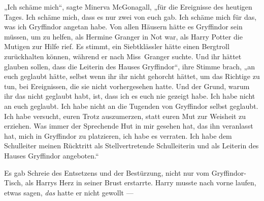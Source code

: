 „Ich schäme mich“, sagte Minerva McGonagall, „für die Ereignisse des heutigen Tages. Ich schäme mich, dass es nur zwei von euch gab. Ich schäme mich für das, was ich Gryffindor angetan habe. Von allen Häusern hätte es Gryffindor sein müssen, um zu helfen, als Hermine Granger in Not war, als Harry Potter die Mutigen zur Hilfe rief. Es stimmt, ein Siebtklässler hätte einen Bergtroll zurückhalten können, während er nach Miss~Granger suchte. Und ihr hättet glauben sollen, dass die Leiterin des Hauses Gryffindor“, ihre Stimme brach, „an euch geglaubt hätte, selbst wenn ihr ihr nicht gehorcht hättet, um das Richtige zu tun, bei Ereignissen, die sie nicht vorhergesehen hatte. Und der Grund, warum ihr das nicht geglaubt habt, ist, dass ich es euch nie gezeigt habe. Ich habe nicht an euch geglaubt. Ich habe nicht an die Tugenden von Gryffindor selbst geglaubt. Ich habe versucht, euren Trotz auszumerzen, statt euren Mut zur Weisheit zu erziehen. Was immer der Sprechende Hut in mir gesehen hat, das ihn veranlasst hat, mich in Gryffindor zu platzieren, ich habe es verraten. Ich habe dem Schulleiter meinen Rücktritt als Stellvertretende Schulleiterin und als Leiterin des Hauses Gryffindor angeboten.“

\later

Es gab Schreie des Entsetzens und der Bestürzung, nicht nur vom Gryffindor-Tisch, als Harrys Herz in seiner Brust erstarrte. Harry musste nach vorne laufen, etwas sagen, \emph{das} hatte er nicht gewollt —


